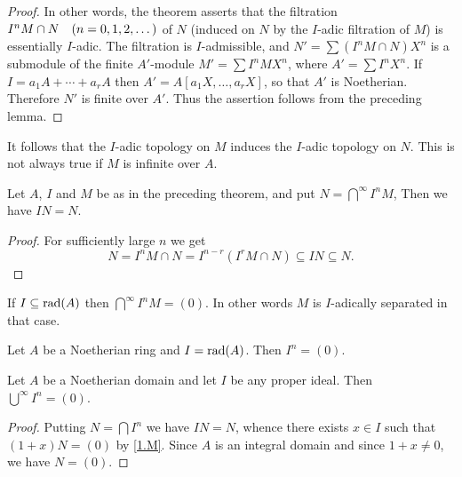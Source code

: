 \documentclass[../main]{subfiles}
\begin{document}
\begin{proof}
In other words, the theorem asserts that the filtration \newline $I^nM \cap N\for{n=0,1,2, \ldots}$ of $N$ (induced on $N$ by the $I$-adic filtration of $M$) is essentially $I$-adic. The filtration is $I$-admissible, and $N'=\sum(I^n M \cap N) X^n$ is a submodule of the finite $A'$-module $M'=\sum I^n M X^n$, where $A'=\sum I^n X^n$. If $I=a_1 A+\cdots+a_rA$ then $A'=A[a_1 X, \ldots, a_r X]$, so that $A'$ is Noetherian. Therefore $N'$ is finite over $A'$. Thus the assertion follows from the preceding lemma.
\end{proof}

\begin{remark}
It follows that the $I$-adic topology on $M$ induces the $I$-adic topology on $N$. This is not always true if $M$ is infinite over $A$.
\end{remark}

\begin{partheorem}\label{thm:016}
Let $A$, $I$ and $M$ be as in the preceding theorem, and put $N=\bigcap^\infty I^nM$, Then we have $IN=N$.
\end{partheorem}

\begin{proof}
For sufficiently large $n$ we get \[N=I^n M \cap N=I^{n-r}(I^r M \cap N) \subseteq IN \subseteq N.\]
\end{proof} 

\begin{corollary}\label{cor:11.01}
If $I \subseteq \operatorname{rad}(A)$ then $\displaystyle \bigcap^\infty I^n M=(0)$. In other words $M$ is $I$-adically separated in that case.
\end{corollary}

\begin{corollary}[Krull]\label{cor:11.02}
Let $A$ be a Noetherian ring and $I=\operatorname{rad}(A)$. Then $I^n=(0)$. 
\end{corollary}

\begin{corollary}[Krull]\label{cor:11.03}
Let $A$ be a Noetherian domain and let $I$ be any proper ideal. Then $\displaystyle \bigcup^\infty I^n=(0)$.
\end{corollary}

\begin{proof}
Putting $N=\bigcap I^n$ we have $IN=N$, whence there exists $x \in I$ such that $(1+x) N=(0)$ by \ref{1.M}. Since $A$ is an integral domain and since $1+x\neq 0$, we have $N=(0)$.
\end{proof}
\end{document}

